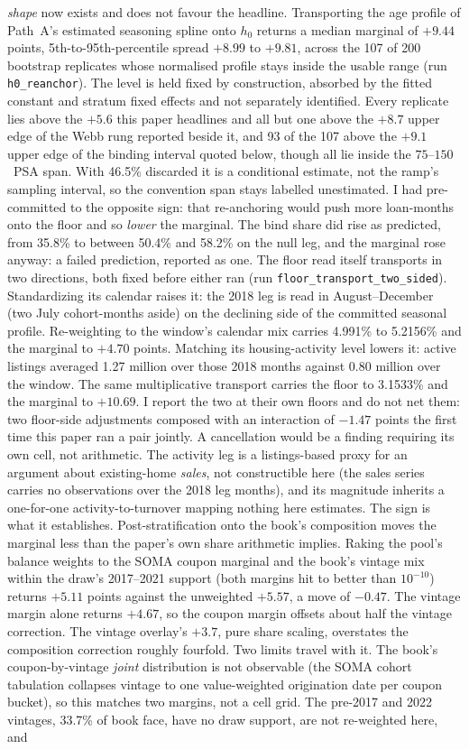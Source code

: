 \documentclass[12pt]{article}
\begin{document}
\emph{shape} now exists and does not favour the headline. Transporting the age profile of Path~A's estimated seasoning spline onto $h_0$ returns a median marginal of $+9.44$ points, 5th-to-95th-percentile spread $+8.99$ to $+9.81$, across the 107 of 200 bootstrap replicates whose normalised profile stays inside the usable range (run \texttt{h0\_reanchor}). The level is held fixed by construction, absorbed by the fitted constant and stratum fixed effects and not separately identified. Every replicate lies above the $+5.6$ this paper headlines and all but one above the $+8.7$ upper edge of the Webb rung reported beside it, and 93 of the 107 above the $+9.1$ upper edge of the binding interval quoted below, though all lie inside the $75$--$150$~PSA span. With 46.5\% discarded it is a conditional estimate, not the ramp's sampling interval, so the convention span stays labelled unestimated. I had pre-committed to the opposite sign: that re-anchoring would push more loan-months onto the floor and so \emph{lower} the marginal. The bind share did rise as predicted, from 35.8\% to between 50.4\% and 58.2\% on the null leg, and the marginal rose anyway: a failed prediction, reported as one. The floor read itself transports in two directions, both fixed before either ran (run \texttt{floor\_transport\_two\_sided}). Standardizing its calendar raises it: the 2018 leg is read in August--December (two July cohort-months aside) on the declining side of the committed seasonal profile. Re-weighting to the window's calendar mix carries 4.991\% to 5.2156\% and the marginal to $+4.70$ points. Matching its housing-activity level lowers it: active listings averaged 1.27 million over those 2018 months against 0.80 million over the window. The same multiplicative transport carries the floor to 3.1533\% and the marginal to $+10.69$. I report the two at their own floors and do not net them: two floor-side adjustments composed with an interaction of $-1.47$ points the first time this paper ran a pair jointly. A cancellation would be a finding requiring its own cell, not arithmetic. The activity leg is a listings-based proxy for an argument about existing-home \emph{sales}, not constructible here (the sales series carries no observations over the 2018 leg months), and its magnitude inherits a one-for-one activity-to-turnover mapping nothing here estimates. The sign is what it establishes. Post-stratification onto the book's composition moves the marginal less than the paper's own share arithmetic implies. Raking the pool's balance weights to the SOMA coupon marginal and the book's vintage mix within the draw's 2017--2021 support (both margins hit to better than $10^{-10}$) returns $+5.11$ points against the unweighted $+5.57$, a move of $-0.47$. The vintage margin alone returns $+4.67$, so the coupon margin offsets about half the vintage correction. The vintage overlay's $+3.7$, pure share scaling, overstates the composition correction roughly fourfold. Two limits travel with it. The book's coupon-by-vintage \emph{joint} distribution is not observable (the SOMA cohort tabulation collapses vintage to one value-weighted origination date per coupon bucket), so this matches two margins, not a cell grid. The pre-2017 and 2022 vintages, 33.7\% of book face, have no draw support, are not re-weighted here, and 
\end{document}
